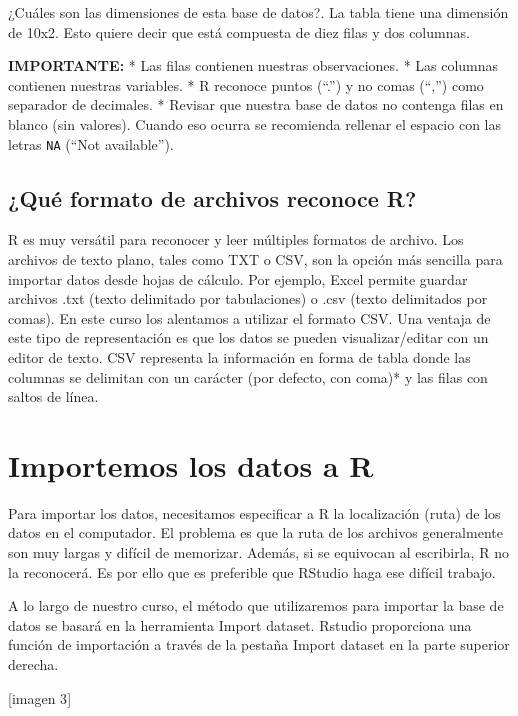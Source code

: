 \documentclass[]{book}
\begin{document}
¿Cuáles son las dimensiones de esta base de datos?. La tabla tiene una dimensión de 10x2. Esto quiere decir que está compuesta de diez filas y dos columnas.

\textbf{IMPORTANTE:}
* Las filas contienen nuestras observaciones.
* Las columnas contienen nuestras variables.
* R reconoce puntos (``.'') y no comas (``,'') como separador de decimales.
* Revisar que nuestra base de datos no contenga filas en blanco (sin valores). Cuando eso ocurra se recomienda rellenar el espacio con las letras \texttt{NA} (``Not available'').

\hypertarget{que-formato-de-archivos-reconoce-r}{%
\subsection{¿Qué formato de archivos reconoce R?}\label{que-formato-de-archivos-reconoce-r}}

R es muy versátil para reconocer y leer múltiples formatos de archivo. Los archivos de texto plano, tales
como TXT o CSV, son la opción más sencilla para importar datos desde hojas de cálculo. Por ejemplo, Excel
permite guardar archivos .txt (texto delimitado por tabulaciones) o .csv (texto delimitados por comas). En
este curso los alentamos a utilizar el formato CSV. Una ventaja de este tipo de representación es que los
datos se pueden visualizar/editar con un editor de texto. CSV representa la información en forma de tabla
donde las columnas se delimitan con un carácter (por defecto, con coma)* y las filas con saltos de línea.

\hypertarget{importemos-los-datos-a-r}{%
\section{Importemos los datos a R}\label{importemos-los-datos-a-r}}

Para importar los datos, necesitamos especificar a R la localización (ruta) de los datos en el computador. El
problema es que la ruta de los archivos generalmente son muy largas y difícil de memorizar. Además, si se
equivocan al escribirla, R no la reconocerá. Es por ello que es preferible que RStudio haga ese difícil trabajo.

A lo largo de nuestro curso, el método que utilizaremos para importar la base de datos se basará en la
herramienta Import dataset. Rstudio proporciona una función de importación a través de la pestaña Import
dataset en la parte superior derecha.

{[}imagen 3{]}
\end{document}
